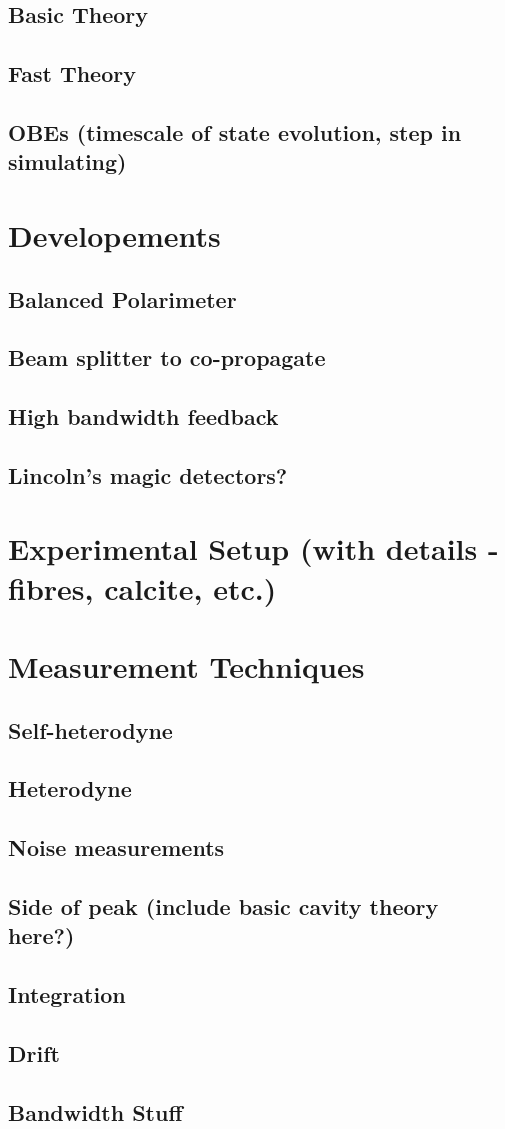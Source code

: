 \subsection{Basic Theory}
\subsection{Fast Theory}
\subsection{OBEs (timescale of state evolution, step in simulating)}
\section{Developements}
\subsection{Balanced Polarimeter}
\subsection{Beam splitter to co-propagate}
\subsection{High bandwidth feedback}
\subsection{Lincoln's magic detectors?}
\section{Experimental Setup (with details - fibres, calcite, etc.)}
\section{Measurement Techniques}
\subsection{Self-heterodyne}
\subsection{Heterodyne}
\subsection{Noise measurements}
\subsection{Side of peak (include basic cavity theory here?)}
\subsection{Integration}
\subsection{Drift}
\subsection{Bandwidth Stuff}
